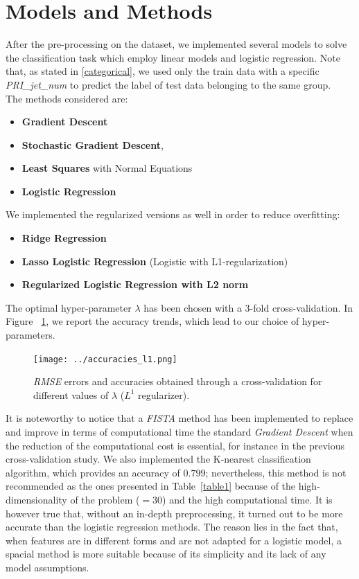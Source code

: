 \documentclass[10pt,conference,compsocconf]{IEEEtran}
\begin{document}
\section{Models and Methods}
\label{models}
After the pre-processing on the dataset, we implemented several models to solve the classification task which employ linear models and logistic regression.
Note that, as stated in \ref{categorical}, we used only the train data with a specific \emph{PRI\_jet\_num} to predict the label of test data belonging to the same group. \\
The methods considered are:
\begin{itemize}
    \item \textbf{Gradient Descent}
    \item \textbf{Stochastic Gradient Descent}, 
    \item \textbf{Least Squares} with Normal Equations
    \item \textbf{Logistic Regression}
    \end{itemize}
We implemented the regularized versions as well in order to reduce overfitting:
\begin{itemize}
\item \textbf{Ridge Regression}
\item \textbf{Lasso Logistic Regression} (Logistic with L1-regularization)
\item \textbf{Regularized Logistic Regression with L2 norm}
\end{itemize}

The optimal hyper-parameter $\lambda$ has been chosen with a 3-fold cross-validation. In Figure ~\ref{reg_lambda}, we report the accuracy trends, which lead to our choice of hyper-parameters.
\vspace{-0.32cm}
\begin{center}
\begin{figure}[h] 
		\texttt{[image: ../accuracies\_l1.png]} 
	\caption{\emph{RMSE} errors and accuracies obtained through a cross-validation for different values of $\lambda$ ($L^1$ regularizer).}
	\label{reg_lambda}
\end{figure}
\vspace{-0.5cm}
\end{center}
It is noteworthy to notice that a \emph{FISTA} method has been implemented to replace and improve in terms of computational time the standard \emph{Gradient Descent} when the reduction of the computational cost is essential, for instance in the previous cross-validation study.
\newline
\newline
We also implemented the K-nearest classification algorithm, which provides an accuracy of $0.799$; nevertheless, this method is not recommended as the ones presented in Table~\ref{table1} because of the high-dimensionality of the problem ($=30$) and the high computational time. It is however true that, without an in-depth preprocessing, it turned out to be more accurate than the logistic regression methods. The reason lies in the fact that, when features are in different forms and are not adapted for a logistic model, a spacial method is more suitable because of its simplicity and its lack of any model assumptions.
\end{document}
